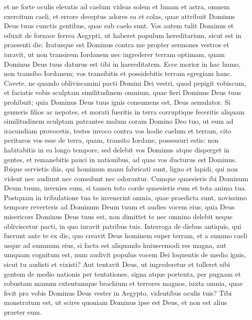 \begin{biblechapter}
\begin{biblechapter}
\begin{biblechapter}
\begin{biblechapter}
\verse et ne forte oculis elevatis ad caelum videas solem et lunam et astra, omnem exercitum caeli, et errore deceptus adores ea et colas, quae attribuit Dominus Deus tuus cunctis gentibus, quae sub caelo sunt. 
 \verse Vos autem tulit Dominus et eduxit de fornace ferrea Aegypti, ut haberet populum hereditarium, sicut est in praesenti die.
 \verse Iratusque est Dominus contra me propter sermones vestros et iuravit, ut non transirem Iordanem nec ingrederer terram optimam, quam Dominus Deus tuus daturus est tibi in haereditatem. 
\verse Ecce morior in hac humo, non transibo Iordanem; vos transibitis et possidebitis terram egregiam hanc. 
\verse Cavete, ne quando obliviscamini pacti Domini Dei vestri, quod pepigit vobiscum, et faciatis vobis sculptam similitudinem omnium, quae fieri Dominus Deus tuus prohibuit; 
\verse quia Dominus Deus tuus ignis consumens est, Deus aemulator.
 \verse Si genueris filios ac nepotes, et morati fueritis in terra corruptique feceritis aliquam similitudinem sculptam patrantes malum coram Domino Deo tuo, ut eum ad iracundiam provocetis, 
\verse testes invoco contra vos hodie caelum et terram, cito perituros vos esse de terra, quam, transito Iordane, possessuri estis: non habitabitis in ea longo tempore, sed delebit vos Dominus 
\verse atque disperget in gentes, et remanebitis pauci in nationibus, ad quas vos ducturus est Dominus. 
\verse Ibique servietis diis, qui hominum manu fabricati sunt, ligno et lapidi, qui non vident nec audiunt nec comedunt nec odorantur. 
\verse Cumque quaesieris ibi Dominum Deum tuum, invenies eum, si tamen toto corde quaesieris eum et tota anima tua. 
\verse Postquam in tribulatione tua te invenerint omnia, quae praedicta sunt, novissimo tempore reverteris ad Dominum Deum tuum et audies vocem eius; 
\verse quia Deus misericors Dominus Deus tuus est, non dimittet te nec omnino delebit neque obliviscetur pacti, in quo iuravit patribus tuis.
 \verse Interroga de diebus antiquis, qui fuerunt ante te ex die, quo creavit Deus hominem super terram, et a summo caeli usque ad summum eius, si facta est aliquando huiuscemodi res magna, aut umquam cognitum est, 
\verse num audivit populus vocem Dei loquentis de medio ignis, sicut tu audisti et vixisti? 
\verse Aut tentavit Deus, ut ingrederetur et tolleret sibi gentem de medio nationis per tentationes, signa atque portenta, per pugnam et robustam manum extentumque brachium et terrores magnos, iuxta omnia, quae fecit pro vobis Dominus Deus vester in Aegypto, videntibus oculis tuis? 
\verse Tibi monstratum est, ut scires quoniam Dominus ipse est Deus, et non est alius praeter eum. 

\end{biblechapter}
\end{biblechapter}
\end{biblechapter}
\end{biblechapter}
